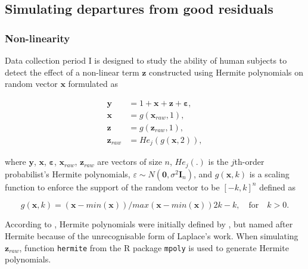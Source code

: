 \documentclass[]{interact}
\theoremstyle{plain}%
\theoremstyle{definition}
\theoremstyle{remark}
\begin{document}
\hypertarget{simulating-departures-from-good-residuals}{%
\subsection{Simulating departures from good
residuals}\label{simulating-departures-from-good-residuals}}

\hypertarget{non-linearity}{%
\subsubsection{Non-linearity}\label{non-linearity}}

Data collection period I is designed to study the ability of human
subjects to detect the effect of a non-linear term \(\boldsymbol{z}\)
constructed using Hermite polynomials on random vector
\(\boldsymbol{x}\) formulated as

\begin{align} \label{eq:nonlinearity-model}
\boldsymbol{y} &= 1 + \boldsymbol{x} + \boldsymbol{z} + \boldsymbol{\varepsilon},\\
\boldsymbol{x} &= g(\boldsymbol{x}_{raw}, 1), \\
\boldsymbol{z} &= g(\boldsymbol{z}_{raw}, 1), \\
\boldsymbol{z}_{raw} &= He_j(g(\boldsymbol{x}, 2)),
\end{align}

\noindent where \(\boldsymbol{y}\), \(\boldsymbol{x}\),
\(\boldsymbol{\varepsilon}\), \(\boldsymbol{x}_{raw}\),
\(\boldsymbol{z}_{raw}\) are vectors of size \(n\), \(He_{j}(.)\) is the
\(j\)th-order probabilist's Hermite polynomials,
\(\varepsilon \sim N(\boldsymbol{0}, \sigma^2\boldsymbol{I}_n)\), and
\(g(\boldsymbol{x}, k)\) is a scaling function to enforce the support of
the random vector to be \([-k, k]^n\) defined as

\begin{equation} \label{eq:scaling-function}
g(\boldsymbol{x}, k) = (\boldsymbol{x} - min(\boldsymbol{x}))/max(\boldsymbol{x} - min(\boldsymbol{x}))2k - k, \quad \text{for} \quad k > 0. 
\end{equation}

According to \citet{abramowitz1964handbook}, Hermite polynomials were
initially defined by \citet{de1820theorie}, but named after Hermite
\citep{hermite1864nouveau} because of the unrecognisable form of
Laplace's work. When simulating \(\boldsymbol{z}_{raw}\), function
\texttt{hermite} from the R package \texttt{mpoly} \citep{mpoly} is used
to generate Hermite polynomials.
\end{document}
